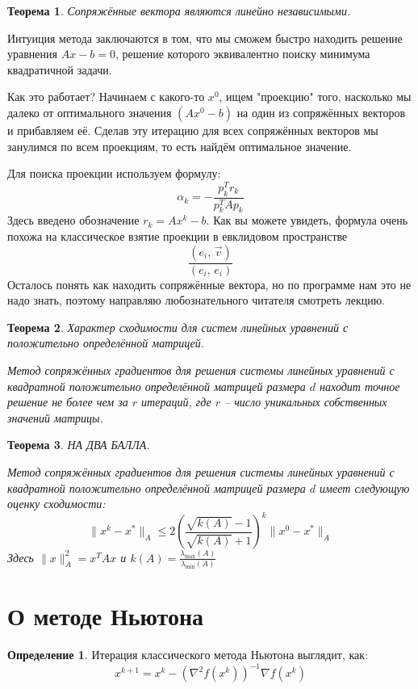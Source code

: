 \documentclass[a4paper,12pt]{article}
\renewcommand{\leq}{\ensuremath{\leqslant}}
\theoremstyle{plain}
\newtheorem{theorem}{Теорема}[section]
\theoremstyle{definition}
\newtheorem{definition}{Определение}[section]
\theoremstyle{remark}
\begin{document}
\begin{theorem}
	Сопряжённые вектора являются линейно независимыми.
\end{theorem}

Интуиция метода заключаются в том, что мы сможем быстро находить решение уравнения $Ax - b = 0$, решение которого эквивалентно поиску минимума квадратичной задачи.

Как это работает? Начинаем с какого-то $x^0$, ищем "проекцию" того, насколько мы далеко от оптимального значения $(Ax^0 - b)$ на один из сопряжённых векторов и прибавляем её. Сделав эту итерацию для всех сопряжённых векторов мы занулимся по всем проекциям, то есть найдём оптимальное значение.

Для поиска проекции используем формулу:
\[
	\alpha_k = -\frac{p_k^Tr_k}{p_k^TAp_k}
\]
Здесь введено обозначение $r_k = Ax^k - b$. Как вы можете увидеть, формула очень похожа на классическое взятие проекции в евклидовом пространстве
\[
	\frac{(e_i,\, \vec{v})}{(e_i,\, e_i)}
\]
Осталось понять как находить сопряжённые вектора, но по программе нам это не надо знать, поэтому направляю любознательного читателя смотреть лекцию.

\begin{theorem}
	Характер сходимости для систем линейных уравнений с положительно определённой матрицей.

	Метод сопряжённых градиентов для решения системы линейных уравнений с квадратной положительно определённой матрицей размера $d$ находит точное решение не более чем за $r$ итераций, где $r$ -- число уникальных собственных значений матрицы.
\end{theorem}

\begin{theorem}
	НА ДВА БАЛЛА.

	Метод сопряжённых градиентов для решения системы линейных уравнений с квадратной положительно определённой матрицей размера $d$ имеет следующую оценку сходимости:
	\[
		\|x^k - x^*\|_A \leq 2\left(\frac{\sqrt{k(A)} - 1}{\sqrt{k(A)} + 1}\right)^k\|x^0 - x^*\|_A
	\]
	Здесь $\|x\|_A^2 = x^TAx$ и $k(A) = \frac{\lambda_{\max}(A)}{\lambda_{\min}(A)}$
\end{theorem}

\section{О методе Ньютона}
\begin{definition}
	Итерация классического метода Ньютона выглядит, как:
	\[
		x^{k + 1} = x^k - \left(\nabla^2 f(x^k)\right)^{-1}\nabla f(x^k)
	\]
\end{definition}
\end{document}
